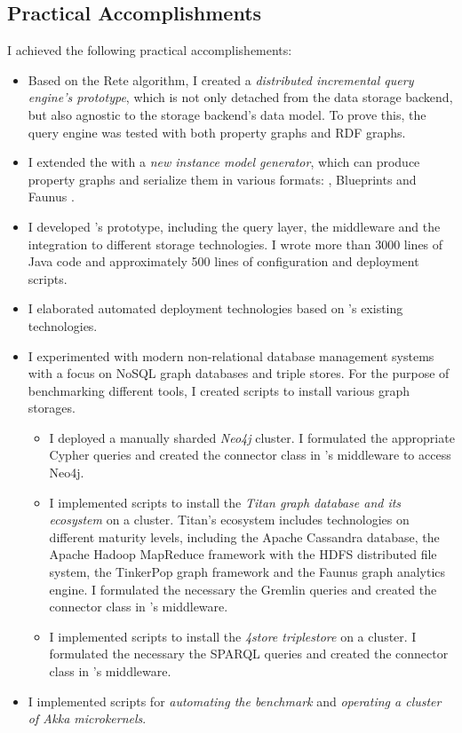 \subsection{Practical Accomplishments}

I achieved the following practical accomplishements:

\begin{itemize}
  \item Based on the Rete algorithm, I created a \emph{distributed incremental query engine's prototype}, which is not only detached from the data storage backend, but also agnostic to the storage backend's data model. To prove this, the query engine was tested with both property graphs and RDF graphs.
  \item I extended the \tb{} with a \emph{new instance model generator}, which can produce property graphs and serialize them in various formats: \graphml{}, Blueprints \graphson{} and Faunus \graphson{}. %
  \item I developed \iqd{}'s prototype, including the query layer, the middleware and the integration to different storage technologies. I wrote more than 3000 lines of Java code and approximately 500 lines of configuration and deployment scripts.
  \item I elaborated automated deployment technologies based on \eiq{}'s existing technologies.
  \item I experimented with modern non-relational database management systems with a focus on NoSQL graph databases and triple stores. For the purpose of benchmarking different tools, I created scripts to install various graph storages. 
  \begin{itemize}
    \item I deployed a manually sharded \emph{Neo4j} cluster. I formulated the appropriate Cypher queries and created the connector class in \iqd{}'s middleware to access Neo4j.
    \item I implemented scripts to install the \emph{Titan graph database and its ecosystem} on a cluster. Titan's ecosystem includes technologies on different maturity levels, including the Apache Cassandra database, the Apache Hadoop MapReduce framework with the HDFS distributed file system, the TinkerPop graph framework and the Faunus graph analytics engine. I formulated the necessary the Gremlin queries and created the connector class in \iqd{}'s middleware.
    \item I implemented scripts to install the \emph{4store triplestore} on a cluster. I formulated the necessary the SPARQL queries and created the connector class in \iqd{}'s middleware. 
  \end{itemize}
  \item I implemented scripts for \emph{automating the benchmark} and \emph{operating a cluster of Akka microkernels}.
\end{itemize}

